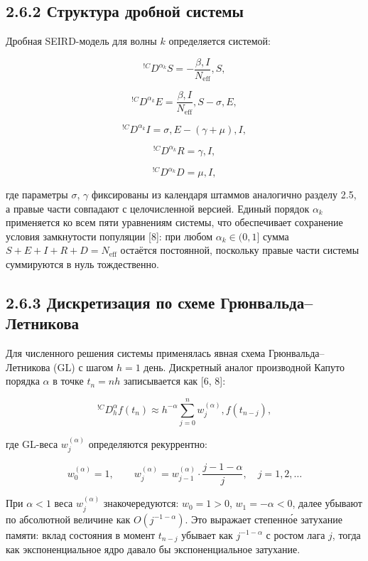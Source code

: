 \documentclass[12pt]{article}
\begin{document}
\subsection{2.6.2 Структура дробной
системы}\label{ux441ux442ux440ux443ux43aux442ux443ux440ux430-ux434ux440ux43eux431ux43dux43eux439-ux441ux438ux441ux442ux435ux43cux44b}

Дробная SEIRD-модель для волны \(k\) определяется системой:

\[{}^{!C}D^{\alpha_k} S = -\frac{\beta, I}{N_{\text{eff}}}, S,\]

\[{}^{!C}D^{\alpha_k} E = \frac{\beta, I}{N_{\text{eff}}}, S - \sigma, E,\]

\[{}^{!C}D^{\alpha_k} I = \sigma, E - (\gamma + \mu), I,\]

\[{}^{!C}D^{\alpha_k} R = \gamma, I,\]

\[{}^{!C}D^{\alpha_k} D = \mu, I,\]

где параметры \(\sigma\), \(\gamma\) фиксированы из календаря штаммов
аналогично разделу 2.5, а правые части совпадают с целочисленной
версией. Единый порядок \(\alpha_k\) применяется ко всем пяти уравнениям
системы, что обеспечивает сохранение условия замкнутости популяции
{[}8{]}: при любом \(\alpha_k \in (0, 1]\) сумма
\(S + E + I + R + D = N_{\text{eff}}\) остаётся постоянной, поскольку
правые части системы суммируются в нуль тождественно.

\subsection{2.6.3 Дискретизация по схеме
Грюнвальда--Летникова}\label{ux434ux438ux441ux43aux440ux435ux442ux438ux437ux430ux446ux438ux44f-ux43fux43e-ux441ux445ux435ux43cux435-ux433ux440ux44eux43dux432ux430ux43bux44cux434ux430ux43bux435ux442ux43dux438ux43aux43eux432ux430}

Для численного решения системы применялась явная схема
Грюнвальда--Летникова (GL) с шагом \(h = 1\) день. Дискретный аналог
производной Капуто порядка \(\alpha\) в точке \(t_n = nh\) записывается
как {[}6, 8{]}:

\[{}^{!C}D^\alpha_h f(t_n) \approx h^{-\alpha} \sum_{j=0}^{n} w_j^{(\alpha)}, f(t_{n-j}),\]

где GL-веса \(w_j^{(\alpha)}\) определяются рекуррентно:

\[w_0^{(\alpha)} = 1, \qquad w_j^{(\alpha)} = w_{j-1}^{(\alpha)} \cdot \frac{j - 1 - \alpha}{j}, \quad j = 1, 2, \ldots\]

При \(\alpha < 1\) веса \(w_j^{(\alpha)}\) знакочередуются:
\(w_0 = 1 > 0\), \(w_1 = -\alpha < 0\), далее убывают по абсолютной
величине как \(O(j^{-1-\alpha})\). Это выражает степенно́е затухание
памяти: вклад состояния в момент \(t_{n-j}\) убывает как
\(j^{-1-\alpha}\) с ростом лага \(j\), тогда как экспоненциальное ядро
давало бы экспоненциальное затухание.
\end{document}
